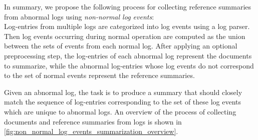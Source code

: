 In summary, we propose the following process for collecting reference summaries from abnormal logs using \emph{non-normal log events}:\\
Log-entries from multiple logs are categorized into log events using a log parser.
Then log events occurring during normal operation are computed as the union between the sets of events from each normal log.
After applying an optional preprocessing step, the log-entries of each abnormal log represent the documents to summarize,
while the abnormal log-entries whose log events do not correspond to the set of normal events represent the reference summaries.

Given an abnormal log,
the task is to produce a summary that should closely match the sequence of log-entries
corresponding to the set of these log events which are unique to abnormal logs.
An overview of the process of collecting documents and reference summaries from logs is shown in \autoref{fig:non_normal_log_events_summarization_overview}.

